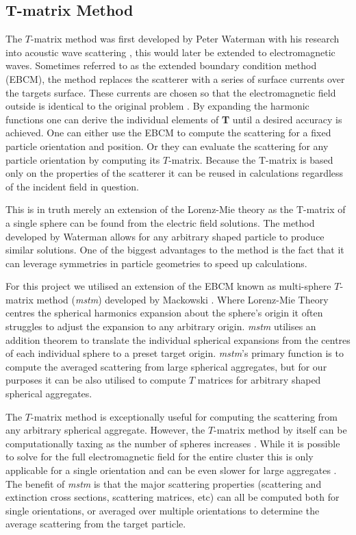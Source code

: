 \subsection{T-matrix Method}
The $T$-matrix method was first developed by Peter Waterman with 
his research into acoustic wave scattering \cite{Waterman1969}, 
this would later be extended to electromagnetic waves. Sometimes 
referred to as the extended boundary condition method (EBCM), the 
method replaces the scatterer with a series of surface currents 
over the targets surface. These currents are chosen so that the 
electromagnetic field outside is identical to the original problem 
\cite{Wriedt1998}. By expanding the harmonic functions one can 
derive the individual elements of \textbf{T} until a desired 
accuracy is achieved. One can either use the EBCM to compute the 
scattering for a fixed particle orientation and position. Or they
can evaluate the scattering for any particle orientation by 
computing its $T$-matrix. Because the T-matrix is based only 
on the properties of the scatterer it can be reused in 
calculations regardless of the incident field in question.

This is in truth merely an extension of the Lorenz-Mie theory 
as the T-matrix of a single sphere can be found from the electric 
field solutions. The method developed by Waterman allows for any 
arbitrary shaped particle to produce similar solutions. One of 
the biggest advantages to the method is the fact that it can 
leverage symmetries in particle geometries to speed up calculations. 

For this project we utilised an extension of the EBCM known as 
multi-sphere $T$-matrix method (\textit{mstm}) developed by 
Mackowski \cite{Mackowski2011}. Where Lorenz-Mie Theory centres
the spherical harmonics expansion about the sphere's origin it
often struggles to adjust the expansion to any arbitrary origin.
\textit{mstm} utilises an addition theorem to translate the 
individual spherical expansions from the centres of each 
individual sphere to a preset target origin. \textit{mstm}'s 
primary function is to compute the averaged scattering from 
large spherical aggregates, but for our purposes it can be
also utilised to compute $T$ matrices for arbitrary shaped
spherical aggregates.

The $T$-matrix method is exceptionally useful for computing the 
scattering from any arbitrary spherical aggregate. However, the 
$T$-matrix method by itself can be computationally taxing as the 
number of spheres increases \cite{Mackowski2011}. While it is 
possible to solve for the full electromagnetic field for the 
entire cluster this is only applicable for a single orientation 
and can be even slower for large aggregates \cite{Mackowski1996, 
Xu1995}. The benefit of \textit{mstm} is that the major scattering 
properties (scattering and extinction cross sections, scattering 
matrices, etc) can all be computed both for single orientations, 
or averaged over multiple orientations to determine the average 
scattering from the target particle. 

